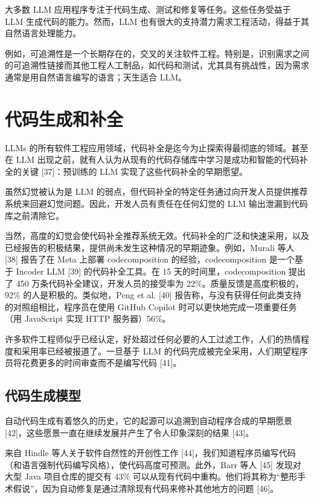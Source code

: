 \begin{translation}
大多数 LLM 应用程序专注于代码生成、测试和修复等任务。这些任务受益于 LLM 生成代码的能力。然而，LLM 也有很大的支持潜力需求工程活动，得益于其自然语言处理能力。

例如，可追溯性是一个长期存在的，交叉的关注软件工程。特别是，识别需求之间的可追溯性链接而其他工程人工制品，如代码和测试，尤其具有挑战性，因为需求通常是用自然语言编写的语言；天生适合 LLM。

\section{代码生成和补全}

LLMs 的所有软件工程应用领域，代码补全是迄今为止探索得最彻底的领域。甚至在 LLM 出现之前，就有人认为从现有的代码存储库中学习是成功和智能的代码补全的关键 [37]：预训练的 LLM 实现了这些代码补全的早期愿望。

虽然幻觉被认为是 LLM 的弱点，但代码补全的特定任务通过向开发人员提供推荐系统来回避幻觉问题。因此，开发人员有责任在任何幻觉的 LLM 输出泄漏到代码库之前清除它。

当然，高度的幻觉会使代码补全推荐系统无效。代码补全的广泛和快速采用，以及已经报告的积极结果，提供尚未发生这种情况的早期迹象。例如，Murali 等人 [38] 报告了在 Meta 上部署 codecomposition 的经验，codecomposition 是一个基于 Incoder LLM [39] 的代码补全工具。在 15 天的时间里，codecomposition 提出了 450 万条代码补全建议，开发人员的接受率为 22\%。质量反馈是高度积极的，92\% 的人是积极的。类似地，Peng et al. [40] 报告称，与没有获得任何此类支持的对照组相比，程序员在使用 GitHub Copilot 时可以更快地完成一项重要任务（用 JavaScript 实现 HTTP 服务器）56\%。

许多软件工程师似乎已经认定，好处超过任何必要的人工过滤工作，人们的热情程度和采用率已经被报道了。一旦基于 LLM 的代码完成被完全采用，人们期望程序员将花费更多的时间审查而不是编写代码 [41]。

\subsection{代码生成模型}

自动代码生成有着悠久的历史，它的起源可以追溯到自动程序合成的早期愿景 [42]，这些愿景一直在继续发展并产生了令人印象深刻的结果 [43]。

来自 Hindle 等人关于软件自然性的开创性工作 [44]，我们知道程序员编写代码（和语言强制代码编写风格），使代码高度可预测。此外，Barr 等人 [45] 发现对大型 Java 项目仓库的提交有 43\% 可以从现有代码中重构。他们将其称为“整形手术假说”，因为自动修复是通过清除现有代码来修补其他地方的问题 [46]。


\end{translation}
